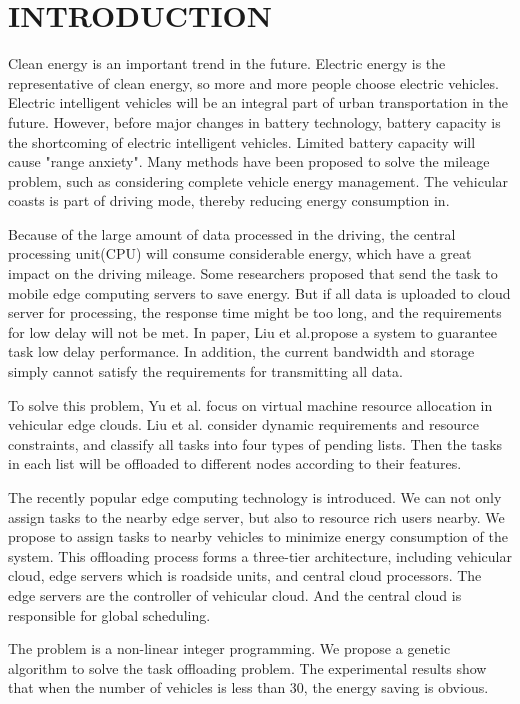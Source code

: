 \documentclass[conference]{IEEEtran}
\begin{document}
    \section{INTRODUCTION}
Clean energy is an important trend in the future. Electric energy is the representative of clean energy, so more and more people choose electric vehicles.
Electric intelligent vehicles will be an integral part of urban transportation in the future. However, before major changes in battery technology, battery capacity is the shortcoming of electric intelligent vehicles\cite{battery}. Limited battery capacity will cause "range anxiety". 
Many methods have been proposed to solve the mileage problem, such as considering complete vehicle energy management\cite{complete}. The vehicular coasts is part of driving mode, thereby reducing energy consumption in\cite{coast}.

Because of the large amount of data processed in the driving, the central processing unit(CPU) will consume considerable energy, which have a great impact on the driving mileage.
Some researchers proposed that send the task to mobile edge computing servers to save energy.
But if all data is uploaded to cloud server for processing, the response time might be too long, and the requirements for low delay will not be met\cite{2021v2mec}. 
In paper\cite{edgeserver}, Liu et al.propose a system to guarantee task low delay performance. 
In addition, the current bandwidth and storage simply cannot satisfy the requirements for transmitting all data.

	To solve this problem, Yu et al.\cite{yu2013toward} focus on virtual machine resource allocation in vehicular edge clouds. 
	Liu et al.\cite{liu2020fourtypes} consider dynamic requirements and resource constraints, and classify all tasks into four types of pending lists. Then the tasks in each list will be offloaded to different nodes according to their features. 

	The recently popular edge computing technology is introduced. We can not only assign tasks to the nearby edge server, but also to resource rich users nearby. 
	We propose to assign tasks to nearby vehicles to minimize energy consumption of the system. 
	This offloading process forms a three-tier architecture, including vehicular cloud, edge servers which is roadside units, and central cloud processors.
	The edge servers are the controller of vehicular cloud. And the central cloud is responsible for global scheduling.

The problem is a non-linear integer programming. 
We propose a genetic algorithm to solve the task offloading problem. 
The experimental results show that when the number of vehicles is less than 30, the energy saving is obvious. 
\end{document}
